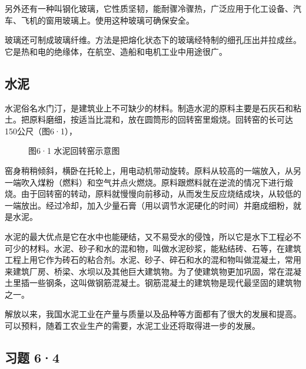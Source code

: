 另外还有一种叫钢化玻璃，它性质坚韧，能耐骤冷骤热，广泛应用于化工设备、汽车、飞机的窗用玻璃上。使用这种玻璃可确保安全。

玻璃还可制成玻璃纤维。方法是把熔化状态下的玻璃经特制的细孔压出并拉成丝。它是热和电的绝缘体，在航空、造船和电机工业中用途很广。

\subsection{水泥}

水泥俗名水门汀，是建筑业上不可缺少的材料。制造水泥的原料主要是石灰石和粘土。把原料磨细，按适当比混和，放在圆筒形的回转窑里煅烧。回转窑的长可达150公尺（图6·1），

\begin{figure}
\centering
\caption{图6·1 水泥回转窑示意图}
\end{figure}

窑身稍稍倾斜，横卧在托轮上，用电动机带动旋转。原料从较高的一端放入，从另一端吹入煤粉（燃料）和空气并点火燃烧。原料跟燃料就在逆流的情况下进行煅烧。由于回转窑的转动，原料就慢慢向前移动，从而发生反应烧结成块，从较低的一端放出。经过冷却，加入少量石膏（用以调节水泥硬化的时间）并磨成细粉，就是水泥。

水泥的最大优点是它在水中也能硬结，又不易受水的侵蚀，所以它是水下工程必不可少的材料。水泥、砂子和水的混和物，叫做水泥砂浆，能粘结砖、石等，在建筑工程上用它作为砖石的粘合剂。水泥、砂子、碎石和水的混和物叫做混凝土，常用来建筑厂房、桥梁、水坝以及其他巨大建筑物。为了使建筑物更加巩固，常在混凝土里插一些钢条，这叫做钢筋混凝土。钢筋混凝土的建筑物是现代最坚固的建筑物之一。

解放以来，我国水泥工业在产量与质量以及品种等方面都有了很大的发展和提高。可以预料，随着工农业生产的需要，水泥工业还将取得进一步的发展。

\subsection{习题 6·4}


